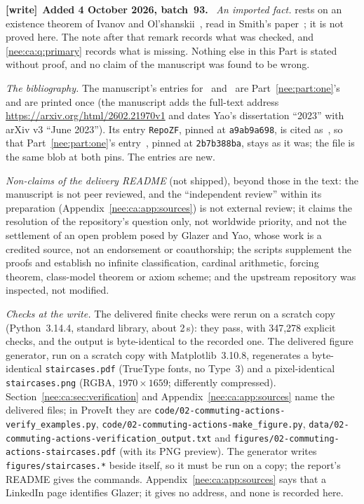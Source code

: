\documentclass[11pt,letterpaper]{article}
\numberwithin{equation}{section}
\theoremstyle{plain}
\theoremstyle{definition}
\theoremstyle{remark}
\newenvironment{writenote}[1][]{\par\smallskip\begingroup\small\raggedright
 \setlength{\parindent}{1.25em}\noindent\textbf{[write]}\if\relax\detokenize{#1}\relax\else~\textbf{#1.}\fi\ }%
 {\par\endgroup\smallskip}
\begin{document}
\begin{writenote}[Added 4 October 2026, batch~93]
\emph{An imported fact.}  rests on an existence theorem of Ivanov and Ol'shanskii~\cite{IO1991}, read in Smith's paper~\cite{Smith1995}; it is not proved here. The note after that remark records what was checked, and \cref{nee:ca:q:primary} records what is missing. Nothing else in this Part is stated without proof, and no claim of the manuscript was found to be wrong.

\emph{The bibliography.} The manuscript's entries for~\cite{GY2026} and~\cite{Yao2023} are Part~\ref{nee:part:one}'s and are printed once (the manuscript adds the full-text address \url{https://arxiv.org/html/2602.21970v1} and dates Yao's dissertation ``2023'' with arXiv v3 ``June 2023''). Its entry \texttt{RepoZF}, pinned at \texttt{a9ab9a698}, is cited as~\cite{RepoZFca}, so that Part~\ref{nee:part:one}'s entry~\cite{RepoZF}, pinned at \texttt{2b7b388ba}, stays as it was; the file is the same blob at both pins. The entries \cite{RepoNaming,Mitchell2014,CGP2010,Smith1995,IO1991} are new.

\emph{Non-claims of the delivery README} (not shipped), beyond those in the text: the manuscript is not peer reviewed, and the ``independent review'' within its preparation (Appendix~\ref{nee:ca:app:sources}) is not external review; it claims the resolution of the repository's question only, not worldwide priority, and not the settlement of an open problem posed by Glazer and Yao, whose work is a credited source, not an endorsement or coauthorship; the scripts supplement the proofs and establish no infinite classification, cardinal arithmetic, forcing theorem, class-model theorem or axiom scheme; and the upstream repository was inspected, not modified.

\emph{Checks at the write.} The delivered finite checks were rerun on a scratch copy (Python~3.14.4, standard library, about 2\,s): they pass, with 347,278 explicit checks, and the output is byte-identical to the recorded one. The delivered figure generator, run on a scratch copy with Matplotlib~3.10.8, regenerates a byte-identical \texttt{staircases.pdf} (TrueType fonts, no Type~3) and a pixel-identical \texttt{staircases.png} (RGBA, $1970\times1659$; differently compressed). Section~\ref{nee:ca:sec:verification} and Appendix~\ref{nee:ca:app:sources} name the delivered files; in ProveIt they are \nolinkurl{code/02-commuting-actions-verify_examples.py}, \nolinkurl{code/02-commuting-actions-make_figure.py}, \nolinkurl{data/02-commuting-actions-verification_output.txt} and \nolinkurl{figures/02-commuting-actions-staircases.pdf} (with its PNG preview). The generator writes \texttt{figures/staircases.*} beside itself, so it must be run on a copy; the report's README gives the commands. Appendix~\ref{nee:ca:app:sources} says that a LinkedIn page identifies Glazer; it gives no address, and none is recorded here.
\end{writenote}
\end{document}
